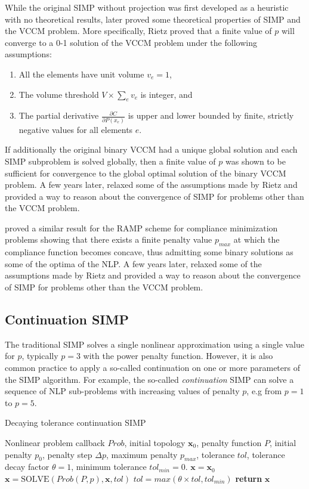 While the original SIMP without projection was first developed as a heuristic with no theoretical results, later  \cite{Rietz2001} proved some theoretical properties of SIMP and the VCCM problem. More specifically, Rietz proved that a finite value of $p$ will converge to a 0-1 solution of the VCCM problem under the following assumptions:
\begin{enumerate}[label=(\arabic*)]
    \item All the elements have unit volume $v_e = 1$, 
    \item The volume threshold $V \times \sum\limits_e v_e$ is integer, and 
    \item The partial derivative $\frac{\partial C}{\partial P(x_e)}$ is upper and lower bounded by finite, strictly negative values for all elements $e$.
\end{enumerate}
If additionally the original binary VCCM had a unique global solution and each SIMP subproblem is solved globally, then a finite value of $p$ was shown to be sufficient for convergence to the global optimal solution of the binary VCCM problem. A few years later, \cite{Martinez2005} relaxed some of the assumptions made by Rietz and provided a way to reason about the convergence of SIMP for problems other than the VCCM problem.

\cite{Stolpe2001a} proved a similar result for the RAMP scheme for compliance minimization problems showing that there exists a finite penalty value $p_{max}$ at which the compliance function becomes concave, thus admitting some binary solutions as some of the optima of the NLP. A few years later,  \cite{Martinez2005} relaxed some of the assumptions made by Rietz and provided a way to reason about the convergence of SIMP for problems other than the VCCM problem. 

\subsection{Continuation SIMP}

The traditional SIMP solves a single nonlinear approximation using a single value for $p$, typically $p = 3$ with the power penalty function. However, it is also common practice to apply a so-called continuation on one or more parameters of the SIMP algorithm. For example, the so-called \textit{continuation} SIMP can solve a sequence of NLP sub-problems with increasing values of penalty $p$, e.g from $p = 1$ to $p = 5$.

\begin{algorithm}
\caption{Decaying tolerance continuation SIMP}
\label{alg:cont_simp}
\begin{algorithmic}[1]
  \REQUIRE Nonlinear problem callback $Prob$, initial topology $\bm{x}_0$, penalty function $P$, initial penalty $p_0$, penalty step $\Delta p$, maximum penalty $p_{max}$, tolerance $tol$, tolerance decay factor $\theta = 1$, minimum tolerance $tol_{min} = 0$.
  \STATE $\bm{x} = \bm{x}_0$
  \STATE $\bm{x} = \text{SOLVE}(Prob(P, p), \bm{x}, tol)$
  \STATE $tol = max(\theta \times tol, tol_{min})$
  \ENDFOR
  \STATE \textbf{return} $\bm{x}$
\end{algorithmic}
\end{algorithm}

